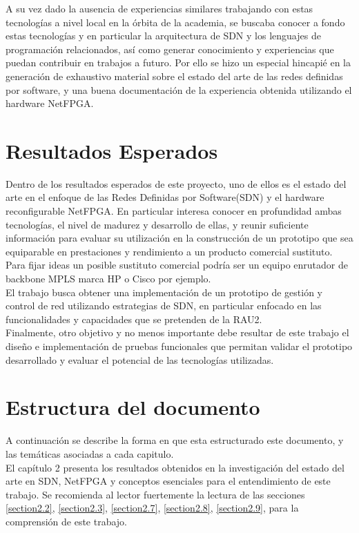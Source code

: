 A su vez dado la ausencia de experiencias similares  trabajando con estas tecnologías a nivel local en la órbita de la academia, se buscaba conocer a fondo estas tecnologías y en particular la arquitectura de SDN y los lenguajes de programación relacionados, así como generar conocimiento y experiencias que puedan contribuir en trabajos a futuro. Por ello se hizo un especial hincapié en la generación de exhaustivo material sobre el estado del arte de las redes definidas por software, y una buena documentación de la experiencia obtenida utilizando el hardware NetFPGA.

\section{Resultados Esperados}
Dentro de los resultados esperados de este proyecto, uno de ellos es el estado del arte en el enfoque de las Redes Definidas por Software(SDN) y el hardware reconfigurable NetFPGA. En particular interesa conocer en profundidad ambas tecnologías, el nivel de madurez y desarrollo de ellas, y reunir suficiente información para evaluar su utilización en la construcción de un prototipo que sea equiparable en prestaciones y rendimiento a un producto comercial sustituto. Para fijar ideas un posible sustituto comercial podría ser un equipo enrutador de backbone MPLS marca HP o Cisco por ejemplo.\\
                   
El trabajo busca obtener una implementación de un prototipo de gestión y control de red utilizando estrategias de SDN, en particular enfocado en las funcionalidades y capacidades que se pretenden de la RAU2.\\

Finalmente, otro objetivo y no menos importante debe resultar de este trabajo el diseño e implementación de pruebas funcionales que permitan validar el prototipo desarrollado y evaluar el potencial de las tecnologías utilizadas.

\section{Estructura del documento}

A continuación se describe la forma en que esta estructurado este documento, y las temáticas asociadas a cada capitulo.\\

El cap\'itulo 2 presenta los resultados obtenidos en la investigación del estado del arte en SDN, NetFPGA y conceptos esenciales para el entendimiento de este trabajo. Se recomienda al lector fuertemente la lectura de las secciones \ref{section2.2}, \ref{section2.3}, \ref{section2.7}, \ref{section2.8}, \ref{section2.9}, para la comprensión de este trabajo.\\

